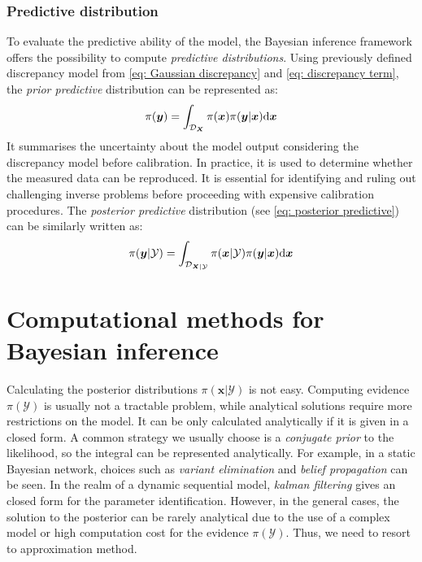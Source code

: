 \subsubsection{Predictive distribution}
To evaluate the predictive ability of the model, the Bayesian inference framework offers the possibility to compute \textit{predictive distributions}. Using previously defined discrepancy model from \cref{eq: Gaussian discrepancy} and \cref{eq: discrepancy term}, the \textit{prior predictive} distribution can be represented as:
\begin{equation}
    \label{eq: prior predictive}
    \pi(\boldsymbol{y}) = \int_{\mathcal{D}_{\boldsymbol{X}}} 
    \pi(\boldsymbol{x}) \pi(\boldsymbol{y}|\boldsymbol{x}) {\rm{d}} \boldsymbol{x}
\end{equation}
It summarises the uncertainty about the model output considering the discrepancy model before calibration. In practice, it is used to determine whether the measured data can be reproduced. It is essential for identifying and ruling out challenging inverse problems before proceeding with expensive calibration procedures. The \textit{posterior predictive} distribution (see \cref{eq: posterior predictive}) can be similarly written as:
\begin{equation}
    \label{eq: posterior predictive}
    \pi(\boldsymbol{y}|\mathcal{Y}) = \int_{\mathcal{D}_{\boldsymbol{X}|\mathcal{Y}}} 
    \pi(\boldsymbol{x}|\mathcal{Y}) \pi(\boldsymbol{y}|\boldsymbol{x}) {\rm{d}} \boldsymbol{x}
\end{equation}
\section{Computational methods for Bayesian inference}
\label{section: Computational methods}
Calculating the posterior distributions $\pi(\boldsymbol{x}|\mathcal{Y})$ is not easy. Computing evidence $\pi(\mathcal{Y})$ is usually not a tractable problem, while analytical solutions require more restrictions on the model. It can be only calculated analytically if it is given in a closed form. A common strategy we usually choose is a \textit{conjugate prior} \citep{gelman1995} to the likelihood, so the integral can be represented analytically. For example, in a static Bayesian network, choices such as \textit{variant elimination} and \textit{belief propagation} \citep{murphy2012} can be seen. In the realm of a dynamic sequential model, \textit{kalman filtering} \citep{nguyen2016} gives an closed form for the parameter identification. However, in the general cases, the solution to the posterior can be rarely analytical due to the use of a complex model or high computation cost for the evidence $\pi(\mathcal{Y})$. Thus, we need to resort to approximation method.

